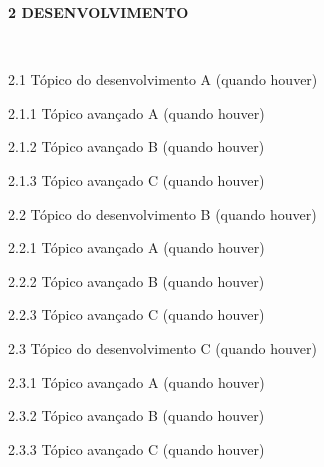 \textbf{2 DESENVOLVIMENTO}

~~

2.1 Tópico do desenvolvimento A (quando houver)
    \vspace{2cm}

2.1.1 Tópico avançado A (quando houver)
    \vspace{2cm}

2.1.2 Tópico avançado B (quando houver)
    \vspace{2cm}

2.1.3 Tópico avançado C (quando houver)
    \vspace{2cm}

2.2 Tópico do desenvolvimento B (quando houver)
    \vspace{2cm}

2.2.1 Tópico avançado A (quando houver)
    \vspace{2cm}

2.2.2 Tópico avançado B (quando houver)
    \vspace{2cm}

2.2.3 Tópico avançado C (quando houver)
    \vspace{2cm}

2.3 Tópico do desenvolvimento C (quando houver)
    \vspace{2cm}

2.3.1 Tópico avançado A (quando houver)
    \vspace{2cm}

2.3.2 Tópico avançado B (quando houver)
    \vspace{2cm}

2.3.3 Tópico avançado C (quando houver)

    \pagebreak